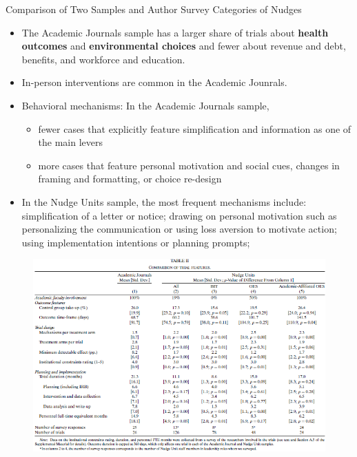 \documentclass[dvipdfmx,11pt]{beamer}
\begin{document}
\begin{frame}{Comparison of Two Samples and Author Survey}
  Categories of Nudges
  \begin{itemize}
    \item The Academic Journals sample has a larger share of trials about \textbf{health outcomes} and \textbf{environmental choices} and fewer about revenue and debt, benefits, and workforce and education.
    \item In-person interventions are common in the Academic Jounrals.
    \item Behavioral mechanisms: In the Academic Journals sample, 
    \begin{itemize}
      \item fewer cases that explicitly feature simplification and information as one of the main levers
      \item more cases that feature personal motivation and social cues, changes in framing and formatting, or choice re-design
    \end{itemize}
    \item In the Nudge Units sample, the most frequent mechanisms include: simplification of a letter or notice; drawing on personal motivation such as personalizing    the communication or using loss aversion to motivate action; using implementation intentions or planning prompts;
  \end{itemize}
\end{frame}

\begin{frame}{}
  \begin{figure}
    \centering
    \includegraphics[scale = .66]{fig_tab/os20220412/T2}
  \end{figure}
\end{frame}
\end{document}
